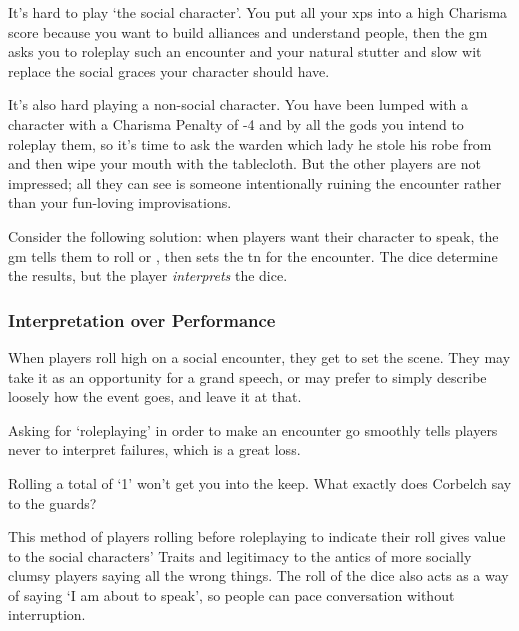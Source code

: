 \begin{multicols}{2}

\noindent
It's hard to play `the social character'.
You put all your \glspl{xp} into a high Charisma score because you want to build alliances and understand people, then the \gls{gm} asks you to roleplay such an encounter and your natural stutter and slow wit replace the social graces your character should have.

It's also hard playing a non-social character.
You have been lumped with a character with a Charisma Penalty of -4 and by all the gods you intend to roleplay them, so it's time to ask the \gls{warden} which lady he stole his robe from and then wipe your mouth with the tablecloth.
But the other players are not impressed; all they can see is someone intentionally ruining the encounter rather than your fun-loving improvisations.

Consider the following solution: when players want their character to speak, the \gls{gm} tells them to roll  or , then sets the \gls{tn} for the encounter.
The dice determine the results, but the player \emph{interprets} the dice.

\subsubsection{Interpretation over Performance}

When players roll high on a social encounter, they get to set the scene.
They may take it as an opportunity for a grand speech, or may prefer to simply describe loosely how the event goes, and leave it at that.

Asking for `roleplaying' in order to make an encounter go smoothly tells players never to interpret failures, which is a great loss.

\begin{speechtext}
  Rolling a total of `1' won't get you into the keep.
  What exactly does Corbelch say to the guards?
\end{speechtext}
This method of players rolling before roleplaying to indicate their roll gives value to the social characters' Traits and legitimacy to the antics of more socially clumsy players saying all the wrong things.
The roll of the dice also acts as a way of saying `I am about to speak', so people can pace conversation without interruption.

\end{multicols}

